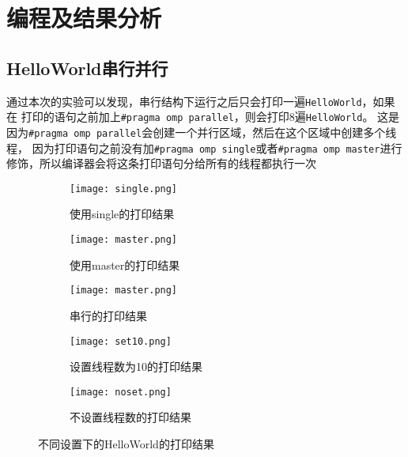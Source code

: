 \documentclass{article}
\begin{document}
\section{编程及结果分析}
\subsection{HelloWorld串行并行}
\indent 通过本次的实验可以发现，串行结构下运行之后只会打印一遍\texttt{HelloWorld}，如果在
打印的语句之前加上\texttt{\#pragma omp parallel}，则会打印8遍\texttt{HelloWorld}。
这是因为\texttt{\#pragma omp parallel}会创建一个并行区域，然后在这个区域中创建多个线程，
因为打印语句之前没有加\texttt{\#pragma omp single}或者\texttt{\#pragma omp master}进行
修饰，所以编译器会将这条打印语句分给所有的线程都执行一次

\begin{figure}
    \centering
    \begin{subfigure}[b]{0.3\textwidth}
        \centering
        \texttt{[image: single.png]}
        \caption{使用single的打印结果}
    \end{subfigure}
    \hfill
    \begin{subfigure}[b]{0.3\textwidth}
        \centering
        \texttt{[image: master.png]}
        \caption{使用master的打印结果}
    \end{subfigure}
    \hfill
    \begin{subfigure}[b]{0.3\textwidth}
        \centering
        \texttt{[image: master.png]}
        \caption{串行的打印结果}
    \end{subfigure}

    \begin{subfigure}[b]{0.45\textwidth}
        \centering
        \texttt{[image: set10.png]}
        \caption{设置线程数为10的打印结果}
    \end{subfigure}
    \hfill
    \begin{subfigure}[b]{0.45\textwidth}
        \centering
        \texttt{[image: noset.png]}
        \caption{不设置线程数的打印结果}
    \end{subfigure}
    \caption{不同设置下的HelloWorld的打印结果}
\end{figure}
\subsection{}
\end{document}
